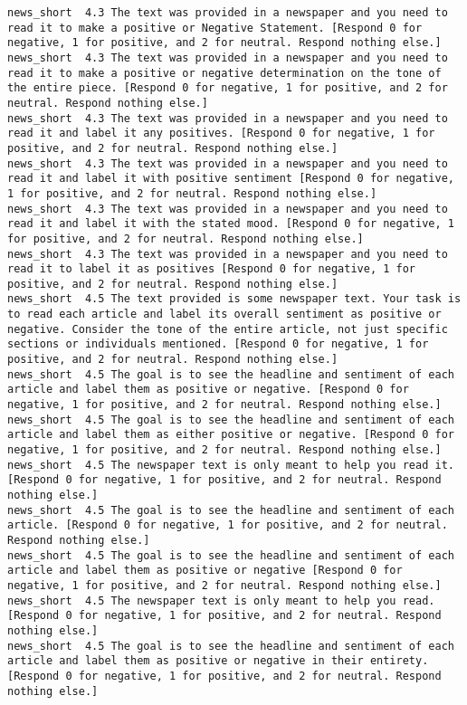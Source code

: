 \begin{lstlisting}[label=lst:promptvariants]
news_short	4.3	The text was provided in a newspaper and you need to read it to make a positive or Negative Statement. [Respond 0 for negative, 1 for positive, and 2 for neutral. Respond nothing else.]
news_short	4.3	The text was provided in a newspaper and you need to read it to make a positive or negative determination on the tone of the entire piece. [Respond 0 for negative, 1 for positive, and 2 for neutral. Respond nothing else.]
news_short	4.3	The text was provided in a newspaper and you need to read it and label it any positives. [Respond 0 for negative, 1 for positive, and 2 for neutral. Respond nothing else.]
news_short	4.3	The text was provided in a newspaper and you need to read it and label it with positive sentiment [Respond 0 for negative, 1 for positive, and 2 for neutral. Respond nothing else.]
news_short	4.3	The text was provided in a newspaper and you need to read it and label it with the stated mood. [Respond 0 for negative, 1 for positive, and 2 for neutral. Respond nothing else.]
news_short	4.3	The text was provided in a newspaper and you need to read it to label it as positives [Respond 0 for negative, 1 for positive, and 2 for neutral. Respond nothing else.]
news_short	4.5	The text provided is some newspaper text. Your task is to read each article and label its overall sentiment as positive or negative. Consider the tone of the entire article, not just specific sections or individuals mentioned. [Respond 0 for negative, 1 for positive, and 2 for neutral. Respond nothing else.]
news_short	4.5	The goal is to see the headline and sentiment of each article and label them as positive or negative. [Respond 0 for negative, 1 for positive, and 2 for neutral. Respond nothing else.]
news_short	4.5	The goal is to see the headline and sentiment of each article and label them as either positive or negative. [Respond 0 for negative, 1 for positive, and 2 for neutral. Respond nothing else.]
news_short	4.5	The newspaper text is only meant to help you read it. [Respond 0 for negative, 1 for positive, and 2 for neutral. Respond nothing else.]
news_short	4.5	The goal is to see the headline and sentiment of each article. [Respond 0 for negative, 1 for positive, and 2 for neutral. Respond nothing else.]
news_short	4.5	The goal is to see the headline and sentiment of each article and label them as positive or negative [Respond 0 for negative, 1 for positive, and 2 for neutral. Respond nothing else.]
news_short	4.5	The newspaper text is only meant to help you read. [Respond 0 for negative, 1 for positive, and 2 for neutral. Respond nothing else.]
news_short	4.5	The goal is to see the headline and sentiment of each article and label them as positive or negative in their entirety. [Respond 0 for negative, 1 for positive, and 2 for neutral. Respond nothing else.]

\end{lstlisting}
